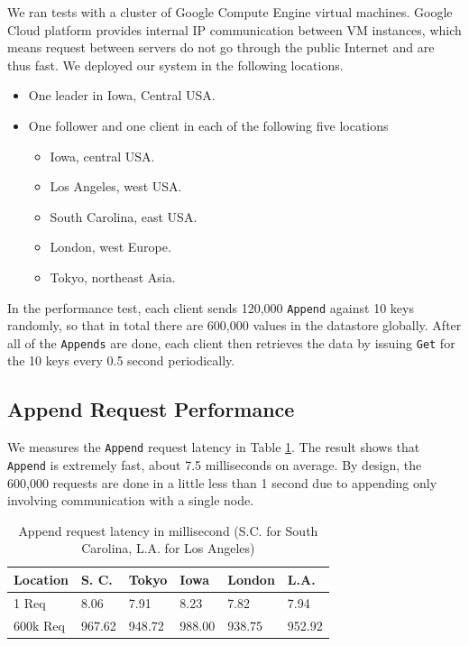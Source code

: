 \documentclass[11pt,english,twocolumn]{article}
\begin{document}
We ran tests with a cluster of Google Compute Engine virtual machines. Google
Cloud platform provides internal IP communication between VM instances, which
means request between servers do not go through the public Internet and are thus
fast. We deployed our system in the following locations.
\begin{itemize}
    \vspace{-0.2cm}
	\item One leader in Iowa, Central USA.
	\vspace{-0.2cm}
	\item One follower and one client in each of the following five locations
\vspace{-0.2cm}
    \begin{itemize}
    \item Iowa, central USA.
\vspace{-0.2cm}
	\item Los Angeles, west USA.
\vspace{-0.2cm}
	\item South Carolina, east USA.
\vspace{-0.2cm}
    \item London, west Europe.
\vspace{-0.2cm}
    \item Tokyo, northeast Asia.
\vspace{-0.2cm}
    \end{itemize}
\end{itemize}

In the performance test, each client sends 120,000
\texttt{Append} against 10 keys randomly, so that in total there are
600,000 values in the datastore globally. After all of the \texttt{Appends} are
done, each client then retrieves the data by issuing \texttt{Get} for the
10 keys every 0.5 second periodically.

\subsection{Append Request Performance} We measures the \texttt{Append} request
latency in Table \ref{AppendLatency}.  The result shows that \texttt{Append} is
extremely fast, about 7.5 milliseconds on average. By design, the 600,000 requests are 
done in a little less than 1 second due to appending only involving
communication with a single node.

\begin{table}[h]
\small
\centering 
\begin{tabular}{ |p{1.6cm}|p{1cm}|p{0.8cm}|p{0.8cm}|p{1cm}|p{0.8cm}|  }
\hline
Location & S. C. & Tokyo & Iowa & London & L.A. \\
 \hline
 1 Req   & 8.06 & 7.91 & 8.23 & 7.82 & 7.94\\
\hline
600k Req & 967.62 & 948.72 & 988.00 & 938.75 & 952.92\\
 \hline
\end{tabular}
\caption{Append request latency in millisecond (S.C. for South Carolina, L.A. for Los Angeles)}
\label{AppendLatency}
\end{table}
\end{document}
